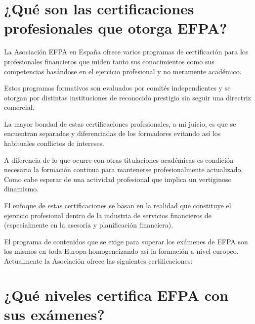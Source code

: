 \documentclass[
  letterpaper,
  DIV=11,
  numbers=noendperiod]{scrreprt}
\begin{document}
\hypertarget{quuxe9-son-las-certificaciones-profesionales-que-otorga-efpa}{%
\section*{\texorpdfstring{\textbf{¿Qué son las certificaciones
profesionales que otorga
EFPA?}}{¿Qué son las certificaciones profesionales que otorga EFPA?}}\label{quuxe9-son-las-certificaciones-profesionales-que-otorga-efpa}}


La Asociación EFPA en España ofrece varios programas de certificación
para los profesionales financieros que miden tanto sus conocimientos
como sus competencias basándose en el ejercicio profesional y no
meramente académico.

Estos programas formativos son evaluados por comités independientes y se
otorgan por distintas instituciones de reconocido prestigio sin seguir
una directriz comercial.

La mayor bondad de estas certificaciones profesionales, a mi juicio, es
que se encuentran separadas y diferenciadas de los formadores evitando
así los habituales conflictos de intereses.

A diferencia de lo que ocurre con otras titulaciones académicas es
condición necesaria la formación continua para mantenerse
profesionalmente actualizado. Como cabe esperar de una actividad
profesional que implica un vertiginoso dinamismo.

El enfoque de estas certificaciones se basan en la realidad que
constituye el ejercicio profesional dentro de la industria de servicios
financieros de (especialmente en la asesoría y planificación
financiera).

El programa de contenidos que se exige para superar los exámenes de EFPA
son los mismos en toda Europa homogeneizando así la formación a nivel
europeo. Actualmente la Asociación ofrece las siguientes
certificaciones:

\hypertarget{quuxe9-niveles-certifica-efpa-con-sus-exuxe1menes}{%
\section*{\texorpdfstring{\textbf{¿Qué niveles certifica EFPA con sus
exámenes?}}{¿Qué niveles certifica EFPA con sus exámenes?}}\label{quuxe9-niveles-certifica-efpa-con-sus-exuxe1menes}}
\end{document}
